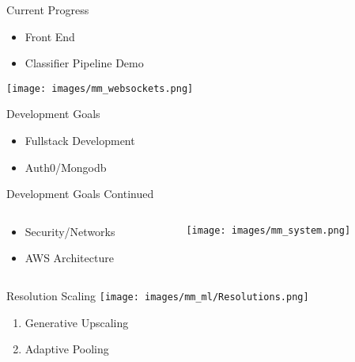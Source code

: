 
\begin{frame}{Current Progress}
    \begin{itemize}
        \item Front End
        \item Classifier Pipeline Demo 
    \end{itemize}
    \centering
    \texttt{[image: images/mm\_websockets.png]}
\end{frame}

\begin{frame}{Development Goals}
    \begin{itemize}
        \item Fullstack Development
        \item Auth0/Mongodb
    \end{itemize}
\end{frame}

\begin{frame}{Development Goals Continued}
        \begin{columns}
        \begin{column}{0.5\textwidth}
            \begin{itemize}
                \item Security/Networks
                \item AWS Architecture
            \end{itemize}
        \end{column}
        \begin{column}{0.5\textwidth}
            \texttt{[image: images/mm\_system.png]}
        \end{column}
    \end{columns}
\end{frame}

\begin{frame}{Resolution Scaling}
    \texttt{[image: images/mm\_ml/Resolutions.png]}
    \begin{enumerate}
        \item Generative Upscaling
        \item Adaptive Pooling
    \end{enumerate}
\end{frame}


